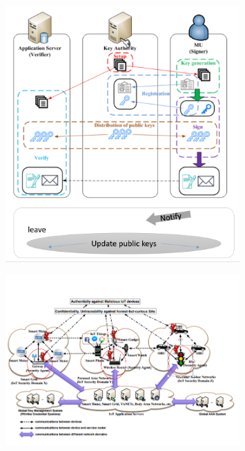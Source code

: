 \documentclass{beamer}
\begin{document}
\begin{frame}{}
    \begin{figure}[t]
        \centering
        \includegraphics[width=0.8\textwidth]{figures/1.png}
        
    \end{figure}
\end{frame}
\begin{frame}{}
    \begin{figure}[t]
        \centering
        \includegraphics[width=0.8\textwidth]{figures/2.png}
        
    \end{figure}
\end{frame}
\end{document}
